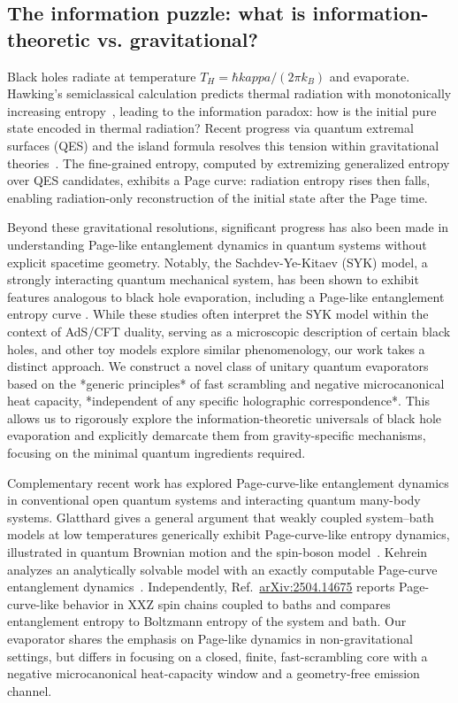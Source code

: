\documentclass[aps,prx,onecolumn,showpacs,superscriptaddress,longbibliography,nofootinbib]{revtex4-2}
\newcommand{\arxivlink}[1]{\href{https://arxiv.org/abs/#1}{arXiv:#1}}
\def\kappa{kappa}%
\begin{document}
\subsection{The information puzzle: what is information-theoretic vs. gravitational?}
Black holes radiate at temperature $T_H=\hbar\kappa/(2\pi k_B)$ and evaporate. Hawking's semiclassical calculation predicts thermal radiation with monotonically increasing entropy~\cite{Hawking1975}, leading to the information paradox: how is the initial pure state encoded in thermal radiation? Recent progress via quantum extremal surfaces (QES) and the island formula resolves this tension within gravitational theories~\cite{EngelhardtWall2015,AEMM2019,Penington2019,AlmheiriRMP2021}. The fine-grained entropy, computed by extremizing generalized entropy over QES candidates, exhibits a Page curve: radiation entropy rises then falls, enabling radiation-only reconstruction of the initial state after the Page time.

Beyond these gravitational resolutions, significant progress has also been made in understanding Page-like entanglement dynamics in quantum systems without explicit spacetime geometry. Notably, the Sachdev-Ye-Kitaev (SYK) model, a strongly interacting quantum mechanical system, has been shown to exhibit features analogous to black hole evaporation, including a Page-like entanglement entropy curve \cite{Singh2021NonMarkovianity,Ling2020JTGravity}. While these studies often interpret the SYK model within the context of AdS/CFT duality, serving as a microscopic description of certain black holes, and other toy models explore similar phenomenology, our work takes a distinct approach. We construct a novel class of unitary quantum evaporators based on the *generic principles* of fast scrambling and negative microcanonical heat capacity, *independent of any specific holographic correspondence*. This allows us to rigorously explore the information-theoretic universals of black hole evaporation and explicitly demarcate them from gravity-specific mechanisms, focusing on the minimal quantum ingredients required.

Complementary recent work has explored Page-curve-like entanglement dynamics in conventional open quantum systems and interacting quantum many-body systems. Glatthard gives a general argument that weakly coupled system--bath models at low temperatures generically exhibit Page-curve-like entropy dynamics, illustrated in quantum Brownian motion and the spin-boson model~\cite{Glatthard2024OpenQS}. Kehrein analyzes an analytically solvable model with an exactly computable Page-curve entanglement dynamics~\cite{Kehrein2024PageCurve}. Independently, Ref.~\arxivlink{2504.14675} reports Page-curve-like behavior in XXZ spin chains coupled to baths and compares entanglement entropy to Boltzmann entropy of the system and bath. Our evaporator shares the emphasis on Page-like dynamics in non-gravitational settings, but differs in focusing on a closed, finite, fast-scrambling core with a negative microcanonical heat-capacity window and a geometry-free emission channel.
\end{document}
